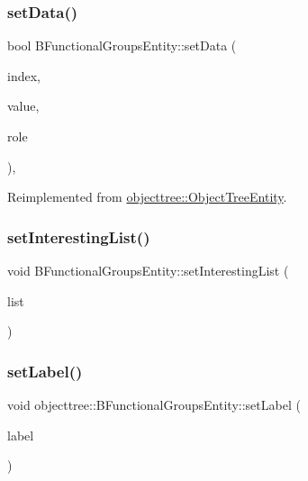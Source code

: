 \subsubsection{\texorpdfstring{setData()}{setData()}}
{\footnotesize\ttfamily bool B\+Functional\+Groups\+Entity\+::set\+Data (\begin{DoxyParamCaption}\item[{const Q\+Model\+Index \&}]{index,  }\item[{const Q\+Variant \&}]{value,  }\item[{int}]{role }\end{DoxyParamCaption})\hspace{0.3cm}{\ttfamily [override]}, {\ttfamily [virtual]}}



Reimplemented from \mbox{\hyperlink{classobjecttree_1_1_object_tree_entity_ab6742194e637093cb1571998bee88ff5}{objecttree\+::\+Object\+Tree\+Entity}}.

\mbox{\label{classobjecttree_1_1_b_functional_groups_entity_a830e15b808a5b9c12db5d3c40b8abaeb}} 
\subsubsection{\texorpdfstring{setInterestingList()}{setInterestingList()}}
{\footnotesize\ttfamily void B\+Functional\+Groups\+Entity\+::set\+Interesting\+List (\begin{DoxyParamCaption}\item[{std\+::shared\+\_\+ptr$<$ \mbox{\hyperlink{class_interesting_list_with_special_values}{Interesting\+List\+With\+Special\+Values}}$<$ int $>$$>$}]{list }\end{DoxyParamCaption})}

\mbox{\label{classobjecttree_1_1_b_functional_groups_entity_a5e9a154cb680c1fad806d7ec1a3d2407}} 
\subsubsection{\texorpdfstring{setLabel()}{setLabel()}}
{\footnotesize\ttfamily void objecttree\+::\+B\+Functional\+Groups\+Entity\+::set\+Label (\begin{DoxyParamCaption}\item[{Q\+String}]{label }\end{DoxyParamCaption})\hspace{0.3cm}{\ttfamily [inline]}}



